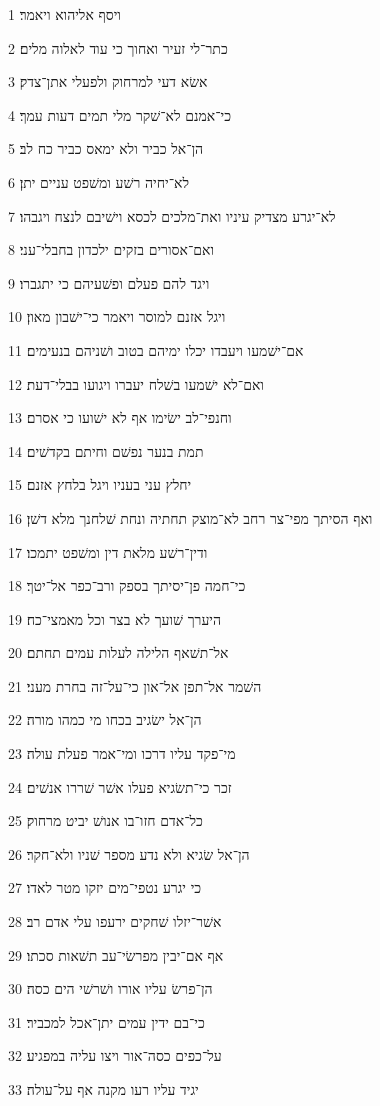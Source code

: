 \par 1 ויסף אליהוא ויאמר׃
\par 2 כתר־לי זעיר ואחוך כי עוד לאלוה מלים׃
\par 3 אשׂא דעי למרחוק ולפעלי אתן־צדק׃
\par 4 כי־אמנם לא־שׁקר מלי תמים דעות עמך׃
\par 5 הן־אל כביר ולא ימאס כביר כח לב׃
\par 6 לא־יחיה רשׁע ומשׁפט עניים יתן׃
\par 7 לא־יגרע מצדיק עיניו ואת־מלכים לכסא וישׁיבם לנצח ויגבהו׃
\par 8 ואם־אסורים בזקים ילכדון בחבלי־עני׃
\par 9 ויגד להם פעלם ופשׁעיהם כי יתגברו׃
\par 10 ויגל אזנם למוסר ויאמר כי־ישׁבון מאון׃
\par 11 אם־ישׁמעו ויעבדו יכלו ימיהם בטוב ושׁניהם בנעימים׃
\par 12 ואם־לא ישׁמעו בשׁלח יעברו ויגועו בבלי־דעת׃
\par 13 וחנפי־לב ישׂימו אף לא ישׁועו כי אסרם׃
\par 14 תמת בנער נפשׁם וחיתם בקדשׁים׃
\par 15 יחלץ עני בעניו ויגל בלחץ אזנם׃
\par 16 ואף הסיתך מפי־צר רחב לא־מוצק תחתיה ונחת שׁלחנך מלא דשׁן׃
\par 17 ודין־רשׁע מלאת דין ומשׁפט יתמכו׃
\par 18 כי־חמה פן־יסיתך בספק ורב־כפר אל־יטך׃
\par 19 היערך שׁועך לא בצר וכל מאמצי־כח׃
\par 20 אל־תשׁאף הלילה לעלות עמים תחתם׃
\par 21 השׁמר אל־תפן אל־און כי־על־זה בחרת מעני׃
\par 22 הן־אל ישׂגיב בכחו מי כמהו מורה׃
\par 23 מי־פקד עליו דרכו ומי־אמר פעלת עולה׃
\par 24 זכר כי־תשׂגיא פעלו אשׁר שׁררו אנשׁים׃
\par 25 כל־אדם חזו־בו אנושׁ יביט מרחוק׃
\par 26 הן־אל שׂגיא ולא נדע מספר שׁניו ולא־חקר׃
\par 27 כי יגרע נטפי־מים יזקו מטר לאדו׃
\par 28 אשׁר־יזלו שׁחקים ירעפו עלי אדם רב׃
\par 29 אף אם־יבין מפרשׂי־עב תשׁאות סכתו׃
\par 30 הן־פרשׂ עליו אורו ושׁרשׁי הים כסה׃
\par 31 כי־בם ידין עמים יתן־אכל למכביר׃
\par 32 על־כפים כסה־אור ויצו עליה במפגיע׃
\par 33 יגיד עליו רעו מקנה אף על־עולה׃

